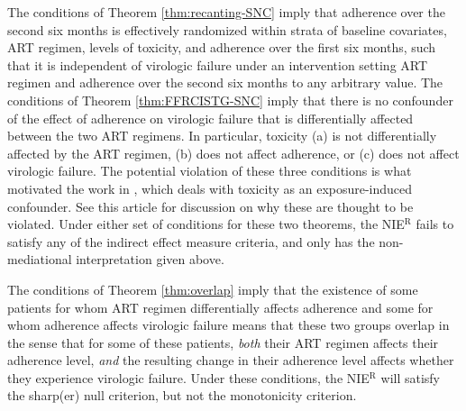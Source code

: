 \documentclass[12pt]{article}
\begin{document}
The conditions of Theorem \ref{thm:recanting-SNC} imply that %
adherence over the second six months %
is effectively randomized within strata of baseline covariates, ART regimen, levels of toxicity, and adherence over the first six months, such that it is independent of virologic failure under an intervention setting ART regimen and adherence over the second six months to any arbitrary value. %
The conditions of Theorem \ref{thm:FFRCISTG-SNC} imply that %
there is no confounder of the effect of adherence on virologic failure that is differentially affected between the two ART regimens. In particular, toxicity (a) is not differentially affected by the ART regimen, (b) does not affect adherence, or (c) does not affect virologic failure. The potential violation of these three conditions is what motivated the work in \cite{miles2017quantifying}, which deals with toxicity as an exposure-induced confounder. See this article for discussion on why these are thought to be violated. Under either set of conditions for these two theorems, the NIE$^{\text{R}}$ fails to satisfy any of the indirect effect measure criteria, and only has the non-mediational interpretation given above.

The conditions of Theorem \ref{thm:overlap} imply that %
the existence of some patients for whom ART regimen differentially affects adherence and some for whom adherence affects virologic failure means that these two groups overlap in the sense that for some of these patients, \emph{both} their ART regimen affects their adherence level, \emph{and} the resulting change in their adherence level affects whether they experience virologic failure. Under these conditions, the NIE$^{\text{R}}$ will satisfy the sharp(er) null criterion, but not the monotonicity criterion. 
\end{document}
